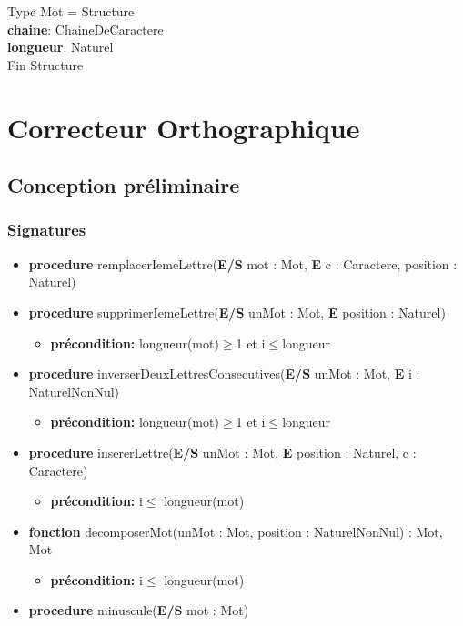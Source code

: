 \documentclass{article}
\begin{document}
    \pagestyle{empty}
    \noindent
    Type Mot = Structure \\
    \textbf{chaine}: ChaineDeCaractere \\
    \textbf{longueur}: Naturel\\
    Fin Structure

    \section*{Correcteur Orthographique}
    \subsection*{Conception préliminaire}
   
    \subsubsection*{Signatures}

	\begin{itemize}[label=$\ $, leftmargin=1cm]
		 \item \textbf{procedure} remplacerIemeLettre(\textbf{E/S} mot : Mot, \textbf{E} c : Caractere, position : Naturel)
		 \item \textbf{procedure} supprimerIemeLettre(\textbf{E/S} unMot : Mot, \textbf{E} position : Naturel)
		 \begin{itemize}[label=$| $]
            \item \textbf{précondition:} longueur(mot)$\ge$1 et i$\le$longueur
         \end{itemize}
		 \item \textbf{procedure} inverserDeuxLettresConsecutives(\textbf{E/S} unMot : Mot,  \textbf{E} i : NaturelNonNul)
		 \begin{itemize}[label=$| $]
            \item \textbf{précondition:} longueur(mot)$\ge$1 et i$\le$longueur
         \end{itemize}
		 
		 \item \textbf{procedure} insererLettre(\textbf{E/S} unMot : Mot, \textbf{E} position : Naturel, c : Caractere)
		 \begin{itemize}[label=$| $]
            \item \textbf{précondition:} i$\le$ longueur(mot)
         \end{itemize}
         \item \textbf{fonction} decomposerMot(unMot : Mot, position : NaturelNonNul) : Mot, Mot
		 \begin{itemize}[label=$| $]
            \item \textbf{précondition:} i$\le$ longueur(mot)
         \end{itemize}
         \item \textbf{procedure} minuscule(\textbf{E/S} mot : Mot)
        
	\end{itemize} 
    
\end{document}
